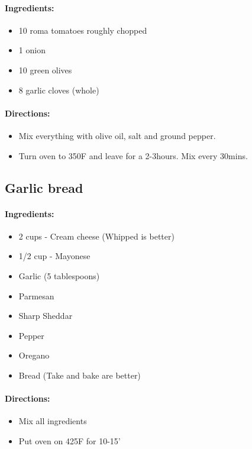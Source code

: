 \documentclass{article}
\begin{document}
\paragraph{Ingredients:}
\begin{itemize}
    \item 10 roma tomatoes roughly chopped
    \item 1 onion
    \item 10 green olives
    \item 8 garlic cloves (whole)
\end{itemize}

\paragraph{Directions:}
\begin{itemize}
    \item Mix everything with olive oil, salt and ground pepper.
    \item Turn oven to 350F and leave for a 2-3hours. Mix every 30mins.
\end{itemize}

\subsection{Garlic bread}

\paragraph{Ingredients:}
\begin{itemize}
    \item 2 cups - Cream cheese (Whipped is better)
    \item 1/2 cup - Mayonese
    \item Garlic (5 tablespoons)
    \item Parmesan
    \item Sharp Sheddar
    \item Pepper
    \item Oregano
    \item Bread (Take and bake are better)
\end{itemize}

\paragraph{Directions:}
\begin{itemize}
    \item Mix all ingredients
    \item Put oven on 425F for 10-15'
\end{itemize}
\end{document}
